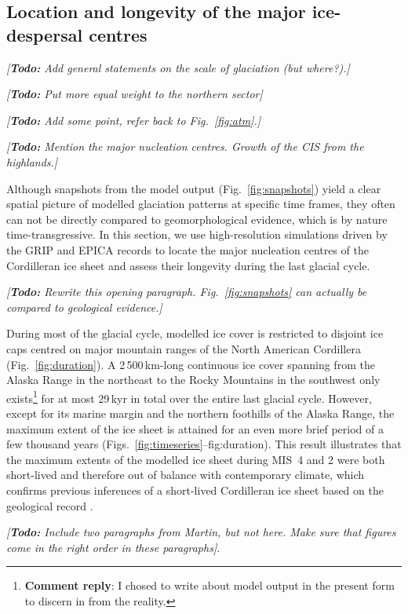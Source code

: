 \documentclass[tc, manuscript]{copernicus}
\newcommand{\renote}[1]{\footnote{\textbf{Comment reply}: #1}}
\newcommand{\todo}[1]{\emph{[\textbf{Todo:} #1]}}
\begin{document}
\subsection{Location and longevity of the major ice-despersal centres}

\todo{Add general statements on the scale of glaciation (but where?).}

\todo{Put more equal weight to the northern sector}

\todo{Add some point, refer back to Fig.~\ref{fig:atm}.}

\todo{Mention the major nucleation centres. Growth of the CIS from the
      highlands.}

Although snapshots from the model output (Fig.~\ref{fig:snapshots}) yield a
clear spatial picture of modelled glaciation patterns at specific time frames,
they often can not be directly compared to geomorphological evidence, which is
by nature time-transgressive. In this section, we use high-resolution
simulations driven by the GRIP and EPICA records to locate the major nucleation
centres of the Cordilleran ice sheet and assess their longevity during the last
glacial cycle.

\todo{Rewrite this opening paragraph. Fig.~\ref{fig:snapshots} can actually be
      compared to geological evidence.}

During most of the glacial cycle, modelled ice cover is restricted to disjoint
ice caps centred on major mountain ranges of the North American Cordillera
(Fig.~\ref{fig:duration}). A 2\,500\,km-long continuous ice cover spanning from
the Alaska Range in the northeast to the Rocky Mountains in the southwest only
exists\renote{
    I chosed to write about model output in the present form to discern in from
    the reality.}
for at most 29\,kyr in total over the entire last glacial cycle. However,
except for its marine margin and the northern foothills of the Alaska Range,
the maximum extent of the ice sheet is attained for an even more brief period
of a few thousand years (Figs.~\ref{fig:timeseries}--{fig:duration}). This
result illustrates that the maximum extents of the modelled ice sheet during
MIS~4 and 2 were both short-lived and therefore out of balance with
contemporary climate, which confirms previous inferences of a short-lived
Cordilleran ice sheet based on the geological record \citep{Clague.etal.1980,
Stroeven.etal.2010}.

\todo{Include two paragraphs from Martin, but not here. Make sure that figures
      come in the right order in these paragraphs}.
\end{document}

